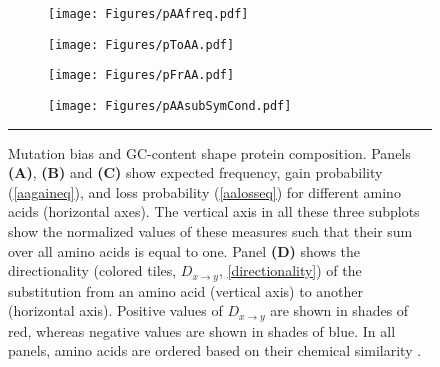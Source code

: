 \documentclass[12pt,a4paper]{article}
\begin{document}
\begin{figure}[!t]
\centering
\begin{subfigure}{0.47\textwidth}
\caption{}
\flushleft
\texttt{[image: Figures/pAAfreq.pdf]}
\end{subfigure}\hfill%
\begin{subfigure}{0.47\textwidth}
\caption{}
\flushleft
\texttt{[image: Figures/pToAA.pdf]}
\end{subfigure}

\vspace{1em}

\begin{subfigure}[t]{0.47\textwidth}
\caption{}
\flushleft
\texttt{[image: Figures/pFrAA.pdf]}
\end{subfigure}\hfill%
\begin{subfigure}[t]{0.47\textwidth}
\caption{}
\flushright
\texttt{[image: Figures/pAAsubSymCond.pdf]}
\end{subfigure}

\caption{Mutation bias and GC-content shape protein composition. Panels \textbf{(A)}, \textbf{(B)} and \textbf{(C)} show expected frequency, gain probability (\autoref{aagaineq}), and loss probability (\autoref{aalosseq}) for different amino acids (horizontal axes). The vertical axis in all these three subplots show the normalized values of these measures such that their sum over all amino acids is equal to one. Panel \textbf{(D)} shows the directionality (colored tiles, $\textit{D}_{x\to y}$, \autoref{directionality}) of the substitution from an amino acid (vertical axis) to another (horizontal axis). Positive values of $\textit{D}_{x\to y}$ are shown in shades of red, whereas negative values are shown in shades of blue. In all panels, amino acids are ordered based on their chemical similarity \citep{PMBEC}.}
\label{aafreq}

\vspace{1ex}
\hrule
\end{figure}
\end{document}
